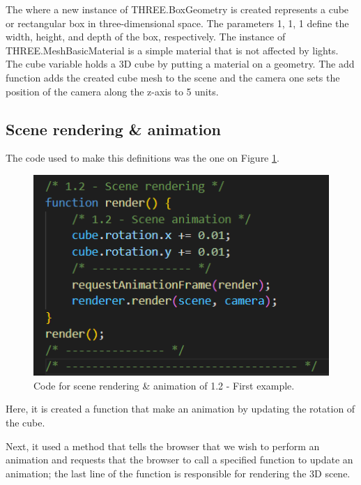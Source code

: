 \documentclass[12pt]{article}
\begin{document}
The where a new instance of THREE.BoxGeometry is created represents a cube or rectangular box in three-dimensional space. The parameters 1, 1, 1 define the width, height, and depth of the box, respectively. The instance of THREE.MeshBasicMaterial is a simple material that is not affected by lights. The cube variable holds a 3D cube by putting a material on a geometry.\newline
The add function adds the created cube mesh to the scene and the camera one sets the position of the camera along the z-axis to 5 units.

\subsection{Scene rendering \& animation}

The code used to make this definitions was the one on Figure \ref{figs:ex12_3}.

\begin{figure}[h!]
    \centering
        \includegraphics[width = \textwidth]{figs/ex12_3.png}
        \caption{Code for scene rendering \& animation of 1.2 - First example.}
        \label{figs:ex12_3}
\end{figure}

Here, it is created a function that make an animation by updating the rotation of the cube.\par

Next, it used a method that tells the browser that we wish to perform an animation and requests that the browser to call a specified function to update an animation; the last line of the function is responsible for rendering the 3D scene.
\end{document}

